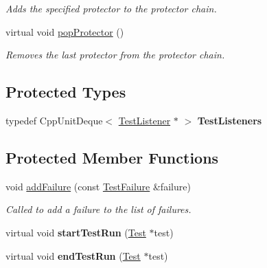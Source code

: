 \begin{DoxyCompactItemize}
\begin{DoxyCompactList}\small\item\em Adds the specified protector to the protector chain. \end{DoxyCompactList}\item 
virtual void \hyperlink{class_test_result_acfbbc6037e1af423f93cdb0360076524}{pop\+Protector} ()\hypertarget{class_test_result_acfbbc6037e1af423f93cdb0360076524}{}\label{class_test_result_acfbbc6037e1af423f93cdb0360076524}

\begin{DoxyCompactList}\small\item\em Removes the last protector from the protector chain. \end{DoxyCompactList}\end{DoxyCompactItemize}
\subsection*{Protected Types}
\begin{DoxyCompactItemize}
\item 
typedef Cpp\+Unit\+Deque$<$ \hyperlink{class_test_listener}{Test\+Listener} $\ast$ $>$ {\bfseries Test\+Listeners}\hypertarget{class_test_result_a781741f5636cab07026c43e141781d19}{}\label{class_test_result_a781741f5636cab07026c43e141781d19}

\end{DoxyCompactItemize}
\subsection*{Protected Member Functions}
\begin{DoxyCompactItemize}
\item 
void \hyperlink{class_test_result_aa423474527cbc89141763ea41336a188}{add\+Failure} (const \hyperlink{class_test_failure}{Test\+Failure} \&failure)\hypertarget{class_test_result_aa423474527cbc89141763ea41336a188}{}\label{class_test_result_aa423474527cbc89141763ea41336a188}

\begin{DoxyCompactList}\small\item\em Called to add a failure to the list of failures. \end{DoxyCompactList}\item 
virtual void {\bfseries start\+Test\+Run} (\hyperlink{class_test}{Test} $\ast$test)\hypertarget{class_test_result_a6263b1ca50fa6bf504332e181bf75670}{}\label{class_test_result_a6263b1ca50fa6bf504332e181bf75670}

\item 
virtual void {\bfseries end\+Test\+Run} (\hyperlink{class_test}{Test} $\ast$test)\hypertarget{class_test_result_a9721fc94b9991cfd3efde322701ebf70}{}\label{class_test_result_a9721fc94b9991cfd3efde322701ebf70}

\end{DoxyCompactItemize}
